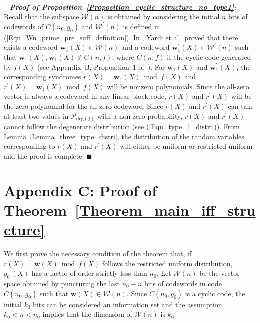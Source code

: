 \documentclass[10pt,journal]{IEEEtran}
\def \deg{{\mathrm{deg}}}
\begin{document}
~ \\~
\textbf{\textit{Proof of Proposition~\ref{Proposition_cyclic_structure_no_type1}:}}\\
% 
Recall that the subspace $\mathcal{W}(n)$ is obtained by considering the initial $n$ bits of codewords of $C(n_0,g_0)$
and $\mathcal{W}^{\prime}(n)$ is defined in (\ref{Eqn_Wn_prime_pre_suff_definition}).
In \cite{TCOMM_2016}, Yardi et al.~proved that 
there exists a codeword $\mathbf{w}_1(X) \in \mathcal{W}(n)$ and a codeword $\mathbf{w}_1^{\prime}(X) \in \mathcal{W}^{\prime}(n)$
such that $\mathbf{w}_1(X), \mathbf{w}_1^{\prime}(X) \notin C(n,f)$, where $C(n,f)$ is the cyclic code generated by $f(X)$
(see Appendix~B, Proposition~1 of~\cite{TCOMM_2016}).
% 
For $\mathbf{w}_1(X)$ and $\mathbf{w}_1^{\prime}(X)$, the corresponding syndromes $r(X) = \mathbf{w}_1(X) \bmod f(X)$ 
and $r^{\prime}(X) = \mathbf{w}_1^{\prime}(X) \bmod f(X)$ will be nonzero polynomials.
Since the all-zero vector is always a codeword in any linear block code, $r(X)$ and $r^{\prime}(X)$ will be the zero polynomial
for the all-zero codeword. 
Since $r(X)$ and $r^{\prime}(X)$ can take at least two values in $\mathcal{P}_{\deg(f)}$ with a non-zero probability, 
$r(X)$ and $r^{\prime}(X)$ cannot follow the degenerate distribution (see (\ref{Eqn_type_1_distri})).
From Lemma~\ref{Lemma_three_type_distri}, the distribution of the random variables corresponding to
$r(X)$ and $r^{\prime}(X)$ will either be uniform or restricted uniform and the proof is complete.
\hfill $\blacksquare$

\section*{Appendix C: Proof of Theorem~\ref{Theorem_main_iff_structure}}
%  
We first prove the necessary condition of the theorem that, if $r(X) = \mathbf{w}(X) \bmod f(X)$ follows the restricted uniform distribution,
$g_0^{\perp}(X)$ has a factor of order strictly less than $n_0$.
Let $\mathcal{W}(n)$ be the vector space obtained by puncturing the last $n_0-n$ bits of codewords in code $C(n_0,g_0)$
such that $\mathbf{w}(X) \in \mathcal{W}(n)$.
Since $C(n_0,g_0)$ is a cyclic code, the initial $k_0$ bits can be considered an information set and 
the assumption $k_0 < n < n_0$ implies that the dimension of $\mathcal{W}(n)$ is $k_0$.
\end{document}
